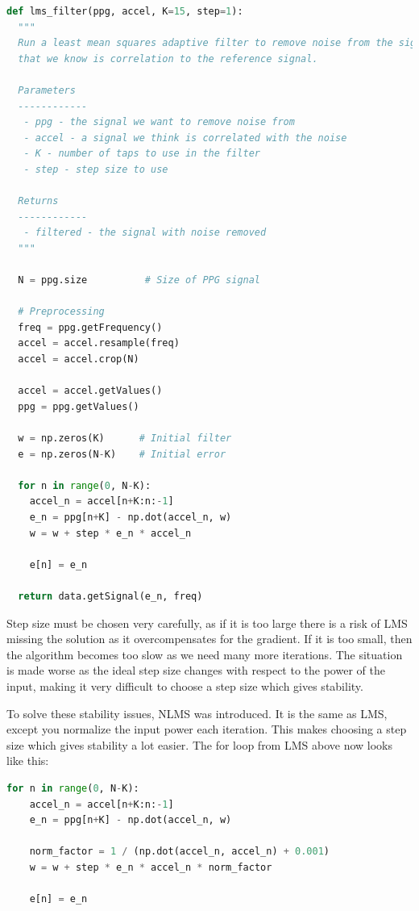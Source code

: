 \documentclass[12pt,a4paper,twoside,openany]{report}
\begin{document}
\begin{lstlisting}[language=Python]
def lms_filter(ppg, accel, K=15, step=1):
  """
  Run a least mean squares adaptive filter to remove noise from the signal
  that we know is correlation to the reference signal.

  Parameters
  ------------
   - ppg - the signal we want to remove noise from
   - accel - a signal we think is correlated with the noise
   - K - number of taps to use in the filter
   - step - step size to use

  Returns
  ------------
   - filtered - the signal with noise removed
  """

  N = ppg.size          # Size of PPG signal

  # Preprocessing
  freq = ppg.getFrequency()
  accel = accel.resample(freq)
  accel = accel.crop(N)

  accel = accel.getValues()
  ppg = ppg.getValues()

  w = np.zeros(K)      # Initial filter
  e = np.zeros(N-K)    # Initial error

  for n in range(0, N-K):
    accel_n = accel[n+K:n:-1]
    e_n = ppg[n+K] - np.dot(accel_n, w)          
    w = w + step * e_n * accel_n

    e[n] = e_n

  return data.getSignal(e_n, freq)
\end{lstlisting}

Step size must be chosen very carefully, as if it is too large there is a risk
of LMS missing the solution as it overcompensates for the gradient. If it is
too small, then the algorithm becomes too slow as we need many more
iterations. The situation is made worse as the ideal step size changes with
respect to the power of the input, making it very difficult to choose a step
size which gives stability.

To solve these stability issues, NLMS was introduced. It is the same as LMS, 
except you normalize the input power each
iteration. This makes choosing a step size which gives stability a lot easier.
The for loop from LMS above now looks like this:

\begin{lstlisting}[language=Python]
for n in range(0, N-K):
	accel_n = accel[n+K:n:-1]
	e_n = ppg[n+K] - np.dot(accel_n, w)          

	norm_factor = 1 / (np.dot(accel_n, accel_n) + 0.001)
	w = w + step * e_n * accel_n * norm_factor

	e[n] = e_n
\end{lstlisting}
\end{document}
